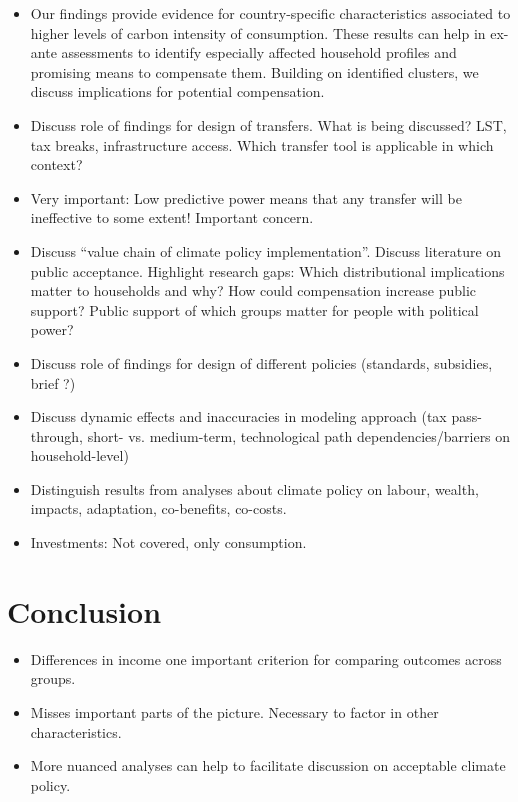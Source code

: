 \documentclass[12pt, a4paper]{article}
\begin{document}
\begin{itemize}
\item Our findings provide evidence for country-specific characteristics associated to higher levels of carbon intensity of consumption. These results can help in ex-ante assessments to identify especially affected household profiles and promising means to compensate them. Building on identified clusters, we discuss implications for potential compensation.
  \item Discuss role of findings for design of transfers. What is being discussed? LST, tax breaks, infrastructure access. Which transfer tool is applicable in which context?
  \item Very important: Low predictive power means that any transfer will be ineffective to some extent! Important concern.
\item Discuss ``value chain of climate policy implementation''. Discuss literature on public acceptance. Highlight research gaps: Which distributional implications matter to households and why? How could compensation increase public support? Public support of which groups matter for people with political power?
 \item Discuss role of findings for design of different policies (standards, subsidies, brief ?)
 \item Discuss dynamic effects and inaccuracies in modeling approach (tax pass-through, short- vs. medium-term, technological path dependencies/barriers on household-level)
 \item Distinguish results from analyses about climate policy on labour, wealth, impacts, adaptation, co-benefits, co-costs.
 \item Investments: Not covered, only consumption.
\end{itemize}

\section{Conclusion} \label{sec:conclusion}

\begin{itemize}
 \item Differences in income one important criterion for comparing outcomes across groups.
 \item Misses important parts of the picture. Necessary to factor in other characteristics.
 \item More nuanced analyses can help to facilitate discussion on acceptable climate policy.
\end{itemize}
\end{document}
